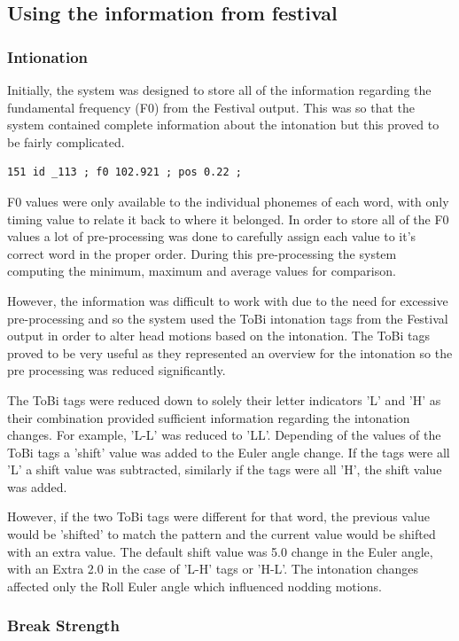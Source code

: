 \documentclass[bsc,frontabs,twoside,singlespacing,parskip,deptreport]{infthesis}
\begin{document}
\subsection{Using the information from festival}
\subsubsection{Intionation}

Initially, the system was designed to store all of the information regarding the fundamental frequency (F0) from the Festival output. This was so that the system contained complete information about the intonation but this proved to be fairly complicated.
\begin{lstlisting}
151 id _113 ; f0 102.921 ; pos 0.22 ; 
\end{lstlisting}
F0 values were only available to the individual phonemes of each word, with only timing value to relate it back to where it belonged. In order to store all of the F0 values a lot of pre-processing was done to carefully assign each value to it's correct word in the proper order. During this pre-processing the system computing the minimum, maximum and average values for comparison.

However, the information was difficult to work with due to the need for excessive pre-processing and so the system used the ToBi intonation tags from the Festival output in order to alter head motions based on the intonation. The ToBi tags proved to be very useful as they represented an overview for the intonation so the pre processing was reduced significantly.

The ToBi tags were reduced down to solely their letter indicators 'L' and 'H' as their combination provided sufficient information regarding the intonation changes. For example, 'L\*-L' was reduced to 'LL'. Depending of the values of the ToBi tags a 'shift' value was added to the Euler angle change. If the tags were all 'L' a shift value was subtracted, similarly if the tags were all 'H', the shift value was added. 

However, if the two ToBi tags were different for that word, the previous value would be 'shifted' to match the pattern and the current value would be shifted with an extra value. The default shift value was 5.0 change in the Euler angle, with an Extra 2.0 in the case of 'L-H' tags or 'H-L'. The intonation changes affected only the Roll Euler angle which influenced nodding motions.

\subsubsection{Break Strength}
\end{document}

